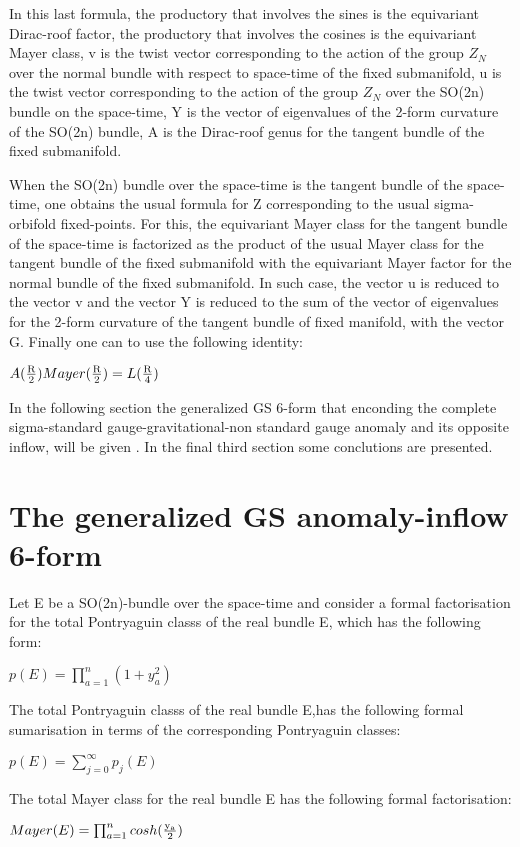 \documentclass[a4paper,a4paper]{article}
\begin{document}
In this last formula, the productory that involves the sines is the equivariant Dirac-roof factor, the productory that involves the cosines is the equivariant Mayer class, v is the twist vector corresponding to the action of the group $Z_N$ over the normal bundle with respect to space-time of the fixed submanifold, u is the twist vector corresponding to the action of the group $Z_N$ over the SO(2n) bundle on the space-time, Y is the vector of eigenvalues of the 2-form curvature of the SO(2n) bundle, A is the Dirac-roof genus for the tangent bundle of the fixed submanifold.




When the SO(2n) bundle over the space-time is the tangent bundle of the space-time, one obtains the usual formula for Z corresponding to the usual sigma-orbifold fixed-points. For this, the equivariant Mayer class for the tangent bundle of the space-time is factorized as the product of the usual Mayer class for the tangent bundle of the fixed submanifold with the equivariant Mayer factor for the normal bundle of the fixed submanifold. In such case, the vector u is reduced to the vector v and the vector Y is reduced to the sum of the vector of eigenvalues for the 2-form curvature of the tangent bundle of fixed manifold, with the vector G. Finally one can to use the following identity: 

\begin{center}
 
{  $A(\frac{\rm R}{\rm 2})Mayer(\frac{\rm R}{\rm 2}) 
 = L(\frac{\rm R}{\rm 4})$}
\end{center} 





In the following section the generalized GS 6-form that enconding the complete sigma-standard gauge-gravitational-non standard gauge anomaly and its opposite inflow, will be given . In the final third section some conclutions are presented.

\section{The generalized GS anomaly-inflow 6-form}

Let E be a SO(2n)-bundle over the space-time and consider a formal factorisation for the total Pontryaguin classs of the real bundle E, which has the following form:

\begin{center}
{  $ p(E) = \prod_{a=1}^n(1+y_a^2)$ }
\end{center}
The total Pontryaguin classs of the real bundle E,has the following formal sumarisation in terms of the corresponding Pontryaguin classes: 
\begin{center}
{  $ p(E) = \sum_{j=0}^{\infty}p_j(E) $ }
\end{center}
The total Mayer class for the real bundle E has the following formal factorisation:
\begin{center}
{  $ Mayer(E) = \prod_{a=1}^ncosh(\frac{\rm y_a}{\rm 2})$ }
\end{center}
\end{document}
